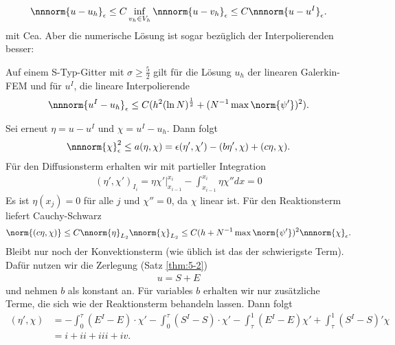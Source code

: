 \begin{align*}
  \nnnorm {u - u_{h}}_{\epsilon} \leq C \inf_{v_{h} \in V_{h}} \nnnorm{u - v_{h}}_{\epsilon} \leq C \nnnorm{u - u^{I}}_{\epsilon}. 
\end{align*}
mit Cea. Aber die numerische Lösung ist sogar bezüglich der Interpolierenden besser: 
\begin{satz}\label{thm:6-16}
  Auf einem S-Typ-Gitter mit $\sigma \geq \frac 52$ gilt für die Lösung $u_{h}$ der linearen Galerkin-FEM und für $u^{I}$, die lineare Interpolierende
  \begin{align*}
    \nnnorm{u^{I} - u_{h}}_{\epsilon} \leq C (h^{2} (\ln N)^{\frac 12} + (N^{-1} \max \norm{\psi'}) ^{2}). 
  \end{align*}
\end{satz}
\begin{beweis}
  Sei erneut $\eta = u-u^{I}$ und $\chi = u^{I} - u_{h}$. Dann folgt
  \begin{align*}
    \nnnorm{\chi}_{\epsilon}^{2} \leq a(\eta, \chi) = \epsilon(\eta', \chi') - (b \eta', \chi) + (c \eta, \chi). 
  \end{align*}
  Für den Diffusionsterm erhalten wir mit partieller Integration
  \begin{align*}
    (\eta', \chi')_{I_{i}} = \eta \chi'|_{x_{i-1}}^{x_{i}} - \int_{x_{i-1}}^{x_{i}} \eta\chi'' dx = 0
  \end{align*}
  Es ist $\eta(x_{j}) = 0$ für alle $j$ und $\chi'' = 0$, da $\chi$ linear ist. Für den Reaktionsterm liefert Cauchy-Schwarz
  \begin{align*}
    \norm{(c \eta, \chi)} \leq C \nnorm{\eta}_{L_{2}} \nnorm{\chi}_{L_{2}} \leq C(h + N^{-1} \max \norm {\psi'})^{2} \nnnorm{\chi}_{\epsilon}. 
  \end{align*}
  Bleibt nur noch der Konvektionsterm (wie üblich ist das der schwierigste Term). Dafür nutzen wir die Zerlegung (Satz \ref{thm:5-2})
  \begin{align*}
    u = S+E
  \end{align*}
  und nehmen $b$ als konstant an. Für variables $b$ erhalten wir nur zusätzliche Terme, die sich wie der Reaktionsterm behandeln lassen. Dann folgt
  \begin{align*}
    (\eta', \chi) &=- \int_{0}^{\tau} (E^{I} - E)\cdot\chi' - \int_{0}^{\tau} (S^{I} - S)\cdot \chi' - \int_{\tau}^{1} (E^{I} - E)\chi' + \int_{\tau}^{1}(S^{I} - S)' \chi\\
    &= i + ii + iii + iv. 
  \end{align*}
  \begin{enumerate}

\end{enumerate}
\end{beweis}

